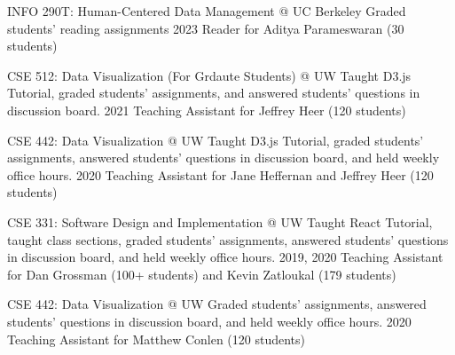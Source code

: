 

\begin{cvpubs}

  \cvteach
    {INFO 290T: Human-Centered Data Management @ UC Berkeley} %
    {Graded students' reading assignments} %
    {2023} %
    {Reader for Aditya Parameswaran (30 students)} %

  \cvteach
    {CSE 512: Data Visualization (For Grdaute Students) @ UW} %
    {Taught D3.js Tutorial, graded students' assignments, and answered students' questions in discussion board.} %
    {2021} %
    {Teaching Assistant for Jeffrey Heer (120 students)} %

  \cvteach
    {CSE 442: Data Visualization @ UW} %
    {Taught D3.js Tutorial, graded students' assignments, answered students' questions in discussion board, and held weekly office hours.} %
    {2020} %
    {Teaching Assistant for Jane Heffernan and Jeffrey Heer (120 students)} %

  \cvteach
    {CSE 331: Software Design and Implementation @ UW} %
    {Taught React Tutorial, taught class sections, graded students' assignments, answered students' questions in discussion board, and held weekly office hours.} %
    {2019, 2020} %
    {Teaching Assistant for Dan Grossman (100+ students) and Kevin Zatloukal (179 students)} %

  \cvteach
    {CSE 442: Data Visualization @ UW} %
    {Graded students' assignments, answered students' questions in discussion board, and held weekly office hours.} %
    {2020} %
    {Teaching Assistant for Matthew Conlen (120 students)} %

\end{cvpubs}
